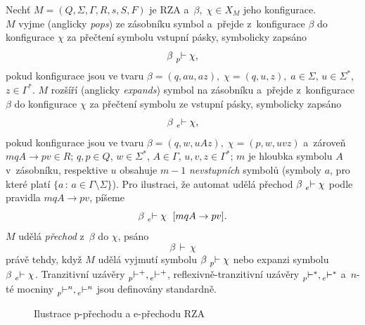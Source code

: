 \begin{definition}\label{def_prechod_rza}
    Nechť $M = (Q, \Sigma, \Gamma, R, s, S, F)$ je RZA a~$\beta,\; \chi \in X_M$ jeho konfigurace.\\
    $M$ vyjme (anglicky \emph{pops}) ze zásobníku symbol a~přejde z~konfigurace $\beta$ do konfigurace $\chi$ za přečtení symbolu vstupní pásky, symbolicky zapsáno
    \begin{equation*}
        \beta\, \prescript{}{p}{\vdash}\; \chi,
    \end{equation*}
    pokud konfigurace jsou ve tvaru $\beta = (q, au, az),\; \chi = (q, u, z),\; a \in \Sigma$, $u \in \Sigma^*$, ${z \in \Gamma^*}$.
    $M$ rozšíří (anglicky \emph{expands}) symbol na zásobníku a~přejde z~konfigurace $\beta$ do konfigurace $\chi$ za přečtení symbolu ze vstupní pásky, symbolicky zapsáno
    \begin{equation*}
        \beta\, \prescript{}{e}{\vdash}\; \chi,
    \end{equation*} 
    pokud konfigurace jsou ve tvaru $\beta = (q, w, uAz),\; \chi = (p, w, uvz)$ a~zároveň $mqA \rightarrow pv \in R$; $q, p \in Q$, $w \in \Sigma^*$, $A \in \Gamma$, $u, v, z \in \Gamma^*$; $m$ je hloubka symbolu $A$ v~zásobníku, respektive $u$ obsahuje $m-1$ \emph{nevstupních} symbolů (symboly $a$, pro které platí $\{a\, :\, a \in \Gamma \setminus \Sigma\}$). 
    Pro ilustraci, že automat udělá přechod $\beta\, \prescript{}{e}{\vdash}\; \chi$ podle pravidla $mqA \rightarrow pv$, píšeme
     \begin{equation*}
        \beta\, \prescript{}{e}{\vdash}\; \chi \ \; [mqA \rightarrow pv].
    \end{equation*}
    $M$ udělá \emph{přechod} z~$\beta$ do $\chi$, psáno
    \begin{equation*}
        \beta\, \vdash\, \chi
    \end{equation*}
    právě tehdy, když $M$ udělá vyjmutí symbolu $\beta\, \prescript{}{p}{\vdash}\; \chi$ nebo expanzi symbolu $\beta\, \prescript{}{e}{\vdash}\; \chi$.
    Tranzitivní uzávěry $\prescript{}{p}{\vdash^+}, \prescript{}{e}{\vdash^+}$, reflexivně-tranzitivní uzávěry $\prescript{}{p}{\vdash^*}, \prescript{}{e}{\vdash^*}$ a~$n$-té mocniny $\prescript{}{p}{\vdash^n}, \prescript{}{e}{\vdash^n}$ jsou definovány standardně.
\end{definition}
\begin{figure}[ht]\label{fig_prechod_rza}
    \caption{Ilustrace p-přechodu a e-přechodu RZA}
\end{figure}

